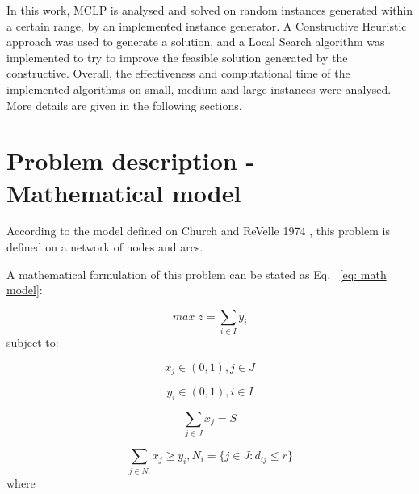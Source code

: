 \documentclass[11pt, a4paper]{article}
\begin{document}
In this work, MCLP is analysed and solved on random instances generated within a certain range, by an implemented instance generator. A Constructive Heuristic approach was used to generate a solution, and a Local Search algorithm was implemented to try to improve the feasible solution generated by the constructive. Overall, the effectiveness and computational time of the implemented algorithms on small, medium and large instances were analysed. More details are given in the following sections.

\section{Problem description - Mathematical model}\label{sec:lit}
According to the model defined on Church and ReVelle 1974 \cite{church1974}, this problem is defined on a network of nodes and arcs. 

A mathematical formulation of this problem can be stated as Eq. ~\ref{eq: math model}:

\begin{equation}\label{eq: math model}
	max \; z = \sum_{i \in I}y_i
\end{equation}
subject to:

\begin{equation}\label{eq: r1}
	x_{j} \in (0,1), j \in J
\end{equation}

\begin{equation}\label{eq: r2}
	y_{i} \in (0,1), i \in I
\end{equation}

\begin{equation}\label{eq: r3}
	\sum_{j \in J}x_j = S
\end{equation}

\begin{equation}\label{eq: r4}
	\sum_{j \in N_i} x_j \geq y_i, N_i = \big\{ j \in J: d_{ij} \leq r \big\}
\end{equation}
where
\end{document}
